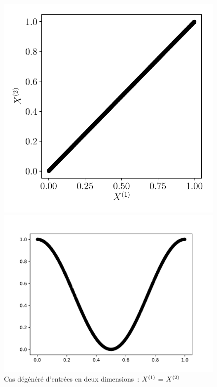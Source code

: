 \documentclass[../main]{subfiles}
\begin{document}
\begin{figure}
	\begin{minipage}{\textwidth}
		\begin{minipage}{0.33\textwidth}
			\includegraphics[width=\textwidth]{2som_id_in.pdf}
			\caption{Cas dégénéré d'entrées en deux dimensions~: $X^{({1})}$ = $X^{({2})}$ \label{fig:id}}
		\end{minipage}
		\begin{minipage}{0.33\textwidth}
			\includegraphics[width=\textwidth]{2som_courbe000_inputs.pdf}

\end{minipage}
\end{minipage}
\end{figure}
\end{document}
